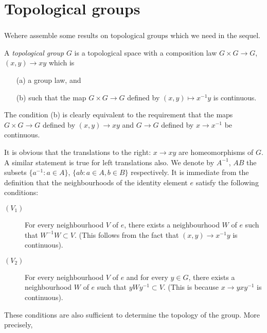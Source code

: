
\chapter{Topological groups}\label{chap1}

\setcounter{section}{1}
\subsection{}\label{chap1-sec1.1}%
We\pageoriginale here assemble some results on topological groups
which we need in the sequel. 

\begin{defi*} %
A {\em topological group} $G$ is a topological space with a
composition law $G \times G \to G$, $(x ,y)\to x y$ which is  
\begin{itemize}
\item[\rm(a)] a group law, and 
\item[\rm(b)] such that the map $G \times G \to G $ defined by $(x ,
  y) \mapsto x^{-1} y$ is continuous. 
\end{itemize}
\end{defi*}

The condition (b) is clearly equivalent to the requirement that the
maps $G \times G \to G$ defined by $(x,y) \to xy$ and $G
\to G$ defined by $x \to x^{-1}$ be continuous. 

It is obvious that the translations to the right: $x \to xy$
are homeomorphisms of $G$. A similar statement is true for left
translations also. We denote by $A^{-1}$, $AB$ the subsets $\{a^{-1}:a
\in A\}$, $\{ab : a \in A, b \in B\}$ respectively. It is immediate from
the definition that the neighbourhoods of the identity element $e$
satisfy the following conditions: 

\begin{description}
\item[$(V_1)$] For every neighbourhood $V$ of $e$, there exists a
  neighbourhood $W$ of $e$ such that $W^{-1} W \subset V$. (This
  follows from the fact that $(x, y) \to x^{-1}y$ is continuous). 

\item[$(V_2)$] For every neighbourhood $V$ of $e$ and for every $y \in
  G$, there exists a neighbourhood $W$ of $e$ such that $y W y^{-1}
  \subset V$. (This is because $x \to yxy^{-1}$ is continuous). 
\end{description}
 
These conditions are also sufficient to determine the topology of the
group. More precisely, 

